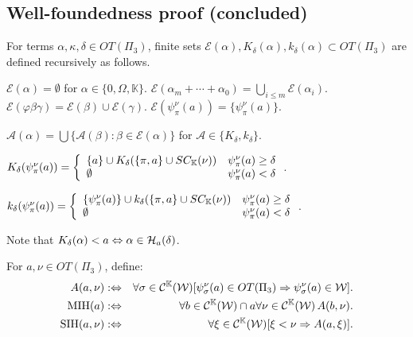 \documentclass{article}
\newcommand{\mK}{\mathbb{K}}
\begin{document}
\subsection{Well-foundedness proof (concluded)}
\begin{definition}\label{df:EKk}

{\rm 
For terms $\alpha,\kappa,\delta\in OT(\Pi_{3})$, finite sets 
$\mathcal{E}(\alpha), K_{\delta}(\alpha),  k_{\delta}(\alpha)\subset OT(\Pi_{3})$ 
 are defined recursively as follows.
\benu

\item
$\mathcal{E}(\alpha)=\emptyset$ for $\alpha\in\{0,\Omega,\mK\}$.
$\mathcal{E}(\alpha_{m}+\cdots+\alpha_{0})=\bigcup_{i\leq m}\mathcal{E}(\alpha_{i})$.
$\mathcal{E}(\varphi\beta\gamma)=\mathcal{E}(\beta)\cup\mathcal{E}(\gamma)$.
$\mathcal{E}(\psi_{\pi}^{\nu}(a))=\{\psi_{\pi}^{\nu}(a)\}$.

\item
$\mathcal{A}(\alpha)=\bigcup\{\mathcal{A}(\beta): \beta\in\mathcal{E}(\alpha)\}$
 for $\mathcal{A}\in\{K_{\delta},k_{\delta}\}$.

\item

$
K_{\del}(\psi_{\pi}^{\nu}(a))=\left\{
\begin{array}{ll}
\{a\}\cup K_{\del}(\{\pi,a\}\cup SC_{\mK}(\nu)) & \psi_{\pi}^{\nu}(a)\geq\del
\\
\emptyset & \psi_{\pi}^{\nu}(a)<\del
\end{array}
\right.
$.

\item

$k_{\del}(\psi_{\pi}^{\nu}(a))=\left\{
\begin{array}{ll}
\{\psi_{\pi}^{\nu}(a)\}\cup k_{\del}(\{\pi,a\}\cup SC_{\mK}(\nu)) & \psi_{\pi}^{\nu}(a)\geq\del
\\
\emptyset & \psi_{\pi}^{\nu}(a)<\del
\end{array}
\right.
$.


\eenu

}
\end{definition}

Note that $K_{\delta}(\alpha)<a \Leftrightarrow \alpha\in{\cal H}_{a}(\delta)$.

\begin{definition}\label{df:id4wfA}
{\rm 
For $a,\nu\in OT(\Pi_{3})$, define:
\begin{eqnarray}
 A(a,\nu) & :\Lrarw &
 \forall\sigma\in\mathcal{C}^{\mK}(\mathcal{W})[\psi_{\sigma}^{\nu}(a)\in OT(\Pi_{3}) \Rarw \psi_{\sigma}^{\nu}(a)\in\mathcal{W}].
\\
\mbox{{\rm MIH}}(a) & :\Lrarw &
 \forall b\in\mathcal{C}^{\mK}(\calw)\cap a\forall \nu\in\mathcal{C}^{\mK}(\calw) \, A(b,\nu).
\\
\mbox{{\rm SIH}}(a,\nu) & :\Lrarw &
 \forall \xi\in \mathcal{C}^{\mK}(\calw) [\xi<\nu  \Rarw A(a,\xi)].
\end{eqnarray}
}
\end{definition}
\end{document}
